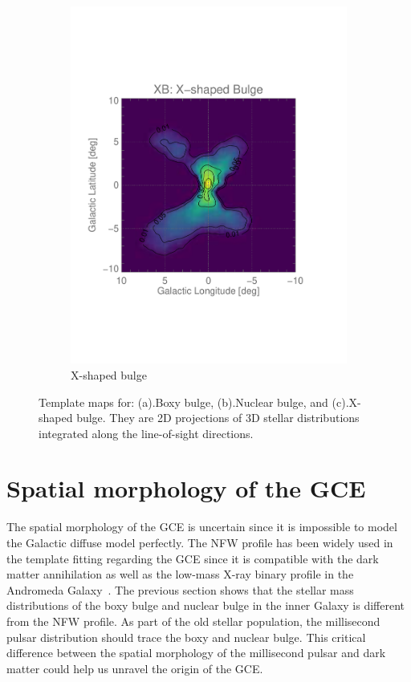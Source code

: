 \documentclass[doublespace,nopageskip]{VTthesis}
\begin{document}
\begin{figure}[htb]
\begin{subfigure}[h]{0.32\textwidth}
		\includegraphics[width=1\textwidth,trim=0.44in 2.03in 1.29in 2.34in,clip=true]{Figures/511keV/map_XB_asinh_grid_20x20.pdf}
		\caption{X-shaped bulge}
		\label{fig:xb_los}
	\end{subfigure}
	\caption{Template maps for: (a).Boxy bulge, (b).Nuclear bulge, and (c).X-shaped bulge. They are 2D projections of 3D stellar distributions integrated along the line-of-sight directions.}
	\label{fig:bulge_los}
\end{figure}

\section{Spatial morphology of the GCE}\label{se:GCEmor}

The spatial morphology of the GCE is uncertain since it is impossible to model the Galactic diffuse model perfectly. The NFW profile has been widely used in the template fitting regarding the GCE since it is compatible with the dark matter annihilation as well as the low-mass X-ray binary profile in the Andromeda Galaxy~\cite{2012PhRvD..86h3511A}. The previous section shows that the stellar mass distributions of the boxy bulge and nuclear bulge in the inner Galaxy is different from the NFW profile. As part of the old stellar population, the millisecond pulsar distribution should trace the boxy and nuclear bulge. This critical difference between the spatial morphology of the millisecond pulsar and dark matter could help us unravel the origin of the GCE.
\end{document}
